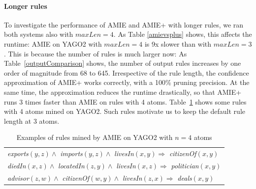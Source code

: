 \paragraph{Longer rules}
To investigate the performance of AMIE and AMIE+ with longer rules, we ran both systems also with $maxLen=4$. As Table \ref{amievsplus} shows, this affects the runtime: AMIE on YAGO2 with $maxLen=4$ is 9x slower than with $maxLen=3$. This is because the number of rules is much larger now: As Table~\ref{outputComparison} shows, the number of output rules increases by one order of magnitude from 68 to 645.
Irrespective of the rule length, the confidence approximation of AMIE+ works correctly, with a 100\% pruning precision. At the same time, the approximation reduces the runtime drastically, so that AMIE+ runs 3 times faster than AMIE on rules with 4 atoms. Table~\ref{rules4atoms} shows some rules with 4 atoms mined on YAGO2. Such rules motivate us to keep the default rule length at 3 atoms.

\begin{table}
\hspace*{-2.4ex}
\begin{tabular}{|l|}
\hline
\emph{exports}$(y,z) \wedge$ \emph{imports}$(y,z) \wedge$ \emph{livesIn}$(x,y) \Rightarrow $ \emph{citizenOf}$(x,y)$\\
\emph{diedIn}$(x,z) \wedge$ \emph{locatedIn}$(z,y) \wedge$ \emph{livesIn}$(x,z) \Rightarrow $ \emph{politician}$(x,y)$\\
\emph{advisor}$(z,w) \wedge$ \emph{citizenOf}$(w,y) \wedge$ \emph{livesIn}$(z,x) \Rightarrow $ \emph{deals}$(x,y)$ \\
\hline
\end{tabular}
\caption{Examples of rules mined by AMIE on YAGO2 with $n=4$ atoms}\label{rules4atoms}
\end{table}


